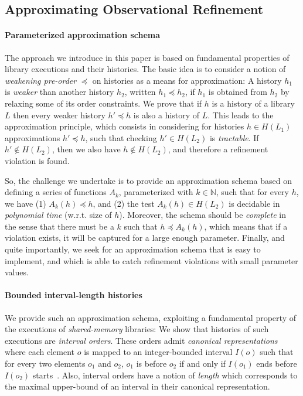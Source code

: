 \subsection{Approximating Observational Refinement}
\label{sec:intro:approx}

\paragraph{Parameterized approximation schema}

The approach we introduce in this paper is based on fundamental properties of
library executions and their histories. The basic idea is to consider a notion
of \emph{weakening pre-order} $\preceq$ on histories as a means for
approximation: A history $h_1$ is \emph{weaker} than another history $h_2$,
written $h_1 \preceq h_2$, if $h_1$ is obtained from $h_2$ by relaxing some of
its order constraints. We prove that if $h$ is a history of a library $L$ then 
every weaker history $h'\preceq h$ is also a history of $L$. This leads to the approximation principle, 
which consists in considering for histories $h\in H(L_1)$ approximations $h' \preceq h$, such that checking 
$h' \in H(L_2)$ is \emph{tractable}. If $h' \not\in H(L_2)$, then we also have $h \not\in
H(L_2)$, and therefore a refinement violation is found.

So, the challenge we undertake is to provide an approximation schema based on
defining a series of functions $A_k$, parameterized with $k \in \mathbb{N}$,
such that for every $h$, we have (1) $A_k (h) \preceq h$, and (2) the test
$A_k(h) \in H(L_2)$ is decidable in \emph{polynomial time} (w.r.t. size of $h$).
Moreover, the schema should be \emph{complete} in the sense that there must be a
$k$ such that $h \preceq A_k(h)$, which means that if a violation exists, it
will be captured for a large enough parameter. Finally, and quite importantly,
we seek for an approximation schema that is easy to implement, and which is
able to catch refinement violations with small parameter values.

\paragraph{Bounded interval-length histories}

We provide such an approximation schema, exploiting a fundamental
property of the executions of \emph{shared-memory} libraries: We show
that histories of such executions are \emph{interval orders}. These orders
admit \emph{canonical representations} where each element $o$ is
mapped to an integer-bounded interval $I(o)$ such that for every two elements
$o_1$ and $o_2$, $o_1$ is before $o_2$ if and only if $I(o_1)$ ends before
$I(o_2)$ starts~\cite{phd/Greenough76}. Also, interval orders have a 
notion of \emph{length} which corresponds to the maximal upper-bound of an
interval in their canonical representation.

